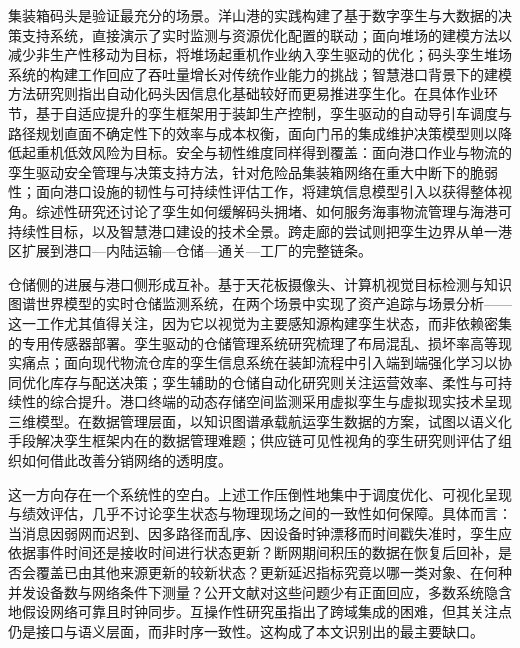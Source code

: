 \documentclass[11pt,a4paper]{article}
\begin{document}
集装箱码头是验证最充分的场景。洋山港的实践构建了基于数字孪生与大数据的决策支持系统，直接演示了实时监测与资源优化配置的联动\cite{doi20236909801}；面向堆场的建模方法以减少非生产性移动为目标，将堆场起重机作业纳入孪生驱动的优化\cite{doijprocs202409361}；码头孪生堆场系统的构建工作回应了吞吐量增长对传统作业能力的挑战\cite{doipr11072223}；智慧港口背景下的建模方法研究则指出自动化码头因信息化基础较好而更易推进孪生化\cite{doidetc202289833}。在具体作业环节，基于自适应提升的孪生框架用于装卸生产控制\cite{doi20211936764}，孪生驱动的自动导引车调度与路径规划直面不确定性下的效率与成本权衡\cite{doimath11122678}，面向门吊的集成维护决策模型则以降低起重机低效风险为目标\cite{dois10845020016895}。安全与韧性维度同样得到覆盖：面向港口作业与物流的孪生驱动安全管理与决策支持方法，针对危险品集装箱网络在重大中断下的脆弱性\cite{doifmars20241455522}；面向港口设施的韧性与可持续性评估工作，将建筑信息模型引入以获得整体视角\cite{doi2378968920252526928}。综述性研究还讨论了孪生如何缓解码头拥堵\cite{doicomputers13060138}、如何服务海事物流管理\cite{doiaccess20243354838}与海港可持续性目标\cite{dois13437024003492}，以及智慧港口建设的技术全景\cite{doiitiliad022}。跨走廊的尝试则把孪生边界从单一港区扩展到港口—内陆运输—仓储—通关—工厂的完整链条\cite{doi38024633802486}。

仓储侧的进展与港口侧形成互补。基于天花板摄像头、计算机视觉目标检测与知识图谱世界模型的实时仓储监测系统，在两个场景中实现了资产追踪与场景分析\cite{doilogistics9040153}——这一工作尤其值得关注，因为它以视觉为主要感知源构建孪生状态，而非依赖密集的专用传感器部署。孪生驱动的仓储管理系统研究梳理了布局混乱、损坏率高等现实痛点\cite{doiijlm0120230030}；面向现代物流仓库的孪生信息系统在装卸流程中引入端到端强化学习以协同优化库存与配送决策\cite{doiicdsca59871202310392494}；孪生辅助的仓储自动化研究则关注运营效率、柔性与可持续性的综合提升\cite{doi30715636ijetmr2024pi4k7x}。港口终端的动态存储空间监测采用虚拟孪生与虚拟现实技术呈现三维模型\cite{doi0010676800003062}。在数据管理层面，以知识图谱承载航运孪生数据的方案，试图以语义化手段解决孪生框架内在的数据管理难题\cite{doi9781668498484ch003}；供应链可见性视角的孪生研究则评估了组织如何借此改善分销网络的透明度\cite{doiasi4020029}。

这一方向存在一个系统性的空白。上述工作压倒性地集中于调度优化、可视化呈现与绩效评估，几乎不讨论孪生状态与物理现场之间的一致性如何保障。具体而言：当消息因弱网而迟到、因多路径而乱序、因设备时钟漂移而时间戳失准时，孪生应依据事件时间还是接收时间进行状态更新？断网期间积压的数据在恢复后回补，是否会覆盖已由其他来源更新的较新状态？更新延迟指标究竟以哪一类对象、在何种并发设备数与网络条件下测量？公开文献对这些问题少有正面回应，多数系统隐含地假设网络可靠且时钟同步。互操作性研究虽指出了跨域集成的困难\cite{doijsyst20233340422}，但其关注点仍是接口与语义层面，而非时序一致性。这构成了本文识别出的最主要缺口。
\end{document}
